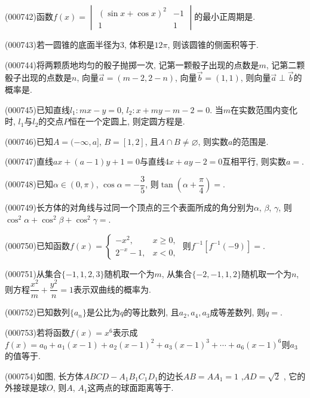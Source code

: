 \item (000742)函数$f(x)=\begin{vmatrix} (\sin x+\cos x)^2 & -1 \\ 1 & 1 \end{vmatrix}$的最小正周期是.
\item (000743)若一圆锥的底面半径为$3$, 体积是$12\pi$, 则该圆锥的侧面积等于.
\item (000744)将两颗质地均匀的骰子抛掷一次, 记第一颗骰子出现的点数是$m$, 记第二颗骰子出现的点数是$n$, 向量$\overrightarrow a=(m-2,2-n)$, 向量$\overrightarrow b=(1,1)$, 则向量$\overrightarrow a\perp \overrightarrow b$的概率是.
\item (000745)已知直线$l_1:mx-y=0$, $l_2:x+my-m-2=0$. 当$m$在实数范围内变化时, $l_1$与$l_2$的交点$P$恒在一个定圆上, 则定圆方程是.
\item (000746)已知$A=(-\infty,a]$, $B=[1,2]$, 且$A\cap B\ne \varnothing$, 则实数$a$的范围是.
\item (000747)直线$ax+(a-1)y+1=0$与直线$4x+ay-2=0$互相平行, 则实数$a=$.
\item (000748)已知$\alpha \in (0,\pi)$, $\cos\alpha =-\dfrac35$, 则$\tan(\alpha+\dfrac{\pi}4)=$.
\item (000749)长方体的对角线与过同一个顶点的三个表面所成的角分别为$\alpha$, $\beta$, $\gamma$, 则$\cos^2\alpha+\cos^2\beta+\cos^2\gamma =$.
\item (000750)已知函数$f(x)=\begin{cases} -x^2, & x\ge 0,  \\2^{-x}-1, & x<0, \end{cases}$ 则$f^{-1}[f^{-1}(-9)]=$.
\item (000751)从集合$\{-1,1,2,3\}$随机取一个为$m$, 从集合$\{-2,-1,1,2\}$随机取一个为$n$, 则方程$\dfrac{x^2}m+\dfrac{y^2}n=1$表示双曲线的概率为.
\item (000752)已知数列$\{a_n\}$是公比为$q$的等比数列, 且$a_2,a_4,a_3$成等差数列, 则$q=$.
\item (000753)若将函数$f(x)=x^6$表示成$f(x)=a_0+a_1(x-1)+a_2(x-1)^2+a_3(x-1)^3+\cdots+a_6(x-1)^6$则$a_3$的值等于.
\item (000754)如图, 长方体$ABCD-A_1B_1C_1D_1$的边长$AB=AA_1=1$ ,$AD=\sqrt2$ , 它的外接球是球$O$, 则$A$, $A_1$这两点的球面距离等于.
\begin{center}
\end{center}
